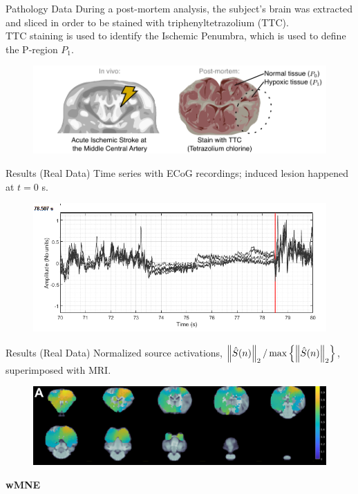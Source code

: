 \documentclass[progressbar=head]{beamer}
\begin{document}
\begin{frame}{Pathology Data}
During a post-mortem analysis, the subject's brain was extracted and sliced in order to be stained with 
triphenyltetrazolium (TTC).\\

TTC staining is used to identify the Ischemic Penumbra, which is used to define the P-region $P_1$.

\begin{figure}
\centering
\includegraphics[width=0.8\linewidth]{./img/Pregions_real}
\end{figure}
\end{frame}

\begin{frame}{Results (Real Data)}
Time series with ECoG recordings; induced lesion happened at $t=0$ s.
\begin{figure}
\centering
\includegraphics[width=0.9\linewidth]{./img_dev2/ECOG_All_sub17diss_diss1}
\end{figure}
\end{frame}

\begin{frame}{Results (Real Data)}
Normalized source activations, $\left\lVert \hat{S}(n) \right\rVert_2/\max\left\{ \left\lVert \hat{S}(n) \right\rVert_2 \right\}$, superimposed with MRI.
\begin{figure}
\centering
\includegraphics[width=0.99\linewidth]{./img_dev3/proposed_A}
\end{figure}
\textbf{wMNE}
\end{frame}
\end{document}
